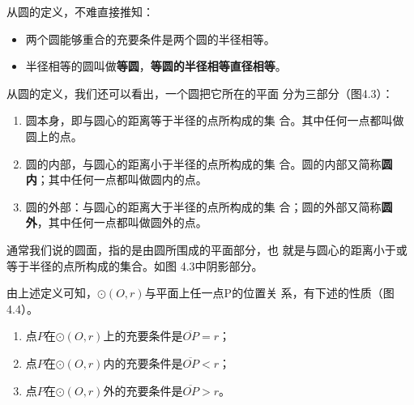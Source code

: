 从圆的定义，不难直接推知：
\begin{itemize}
    \item 两个圆能够重合的充要条件是两个圆的半径相等。
    \item 半径相等的圆叫做\textbf{等圆}，\textbf{等圆的半径相等直径相等}。
\end{itemize}

从圆的定义，我们还可以看出，一个圆把它所在的平面
分为三部分（图4.3）：
\begin{enumerate}
    \item 圆本身，即与圆心的距离等于半径的点所构成的集
合。其中任何一点都叫做圆上的点。
\item 圆的内部，与圆心的距离小于半径的点所构成的集
合。圆的内部又简称\textbf{圆内}；其中任何一点都叫做圆内的点。
\item 圆的外部：与圆心的距离大于半径的点所构成的集
合；圆的外部又简称\textbf{圆外}，其中任何一点都叫做圆外的点。
\end{enumerate}

\begin{figure}[htp]\centering
    \begin{minipage}[t]{0.48\textwidth}
    \centering
{}
    \caption{}
    \end{minipage}
    \begin{minipage}[t]{0.48\textwidth}
    \centering
    \caption{}
    \end{minipage}
    \end{figure}

通常我们说的圆面，指的是由圆所围成的平面部分，也
就是与圆心的距离小于或等于半径的点所构成的集合。如图
4.3中阴影部分。

由上述定义可知，$\odot(O,r)$与平面上任一点P的位置关
系，有下述的性质（图4.4）。
\begin{enumerate}
    \item 点$P$在$\odot(O,r)$上的充要条件是$\overline{OP}=r$；
    \item 点$P$在$\odot(O,r)$内的充要条件是$\overline{OP}<r$；
    \item 点$P$在$\odot(O,r)$外的充要条件是$\overline{OP}>r$。
\end{enumerate}

